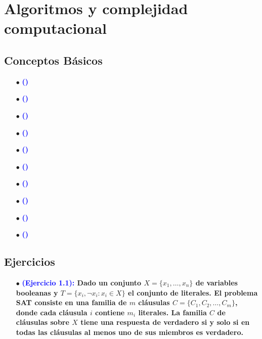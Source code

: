 \documentclass[12pt]{article}
\begin{document}
\section{Algoritmos y complejidad computacional}
{
    \subsection{Conceptos Básicos}
    {
        \begin{enumerate}
            \item[$\bullet$]\textbf{\textcolor{blue}{()}  }{}
            
            \item[$\bullet$]\textbf{\textcolor{blue}{()}  }{}
            
            \item[$\bullet$]\textbf{\textcolor{blue}{()}  }{}
            
            \item[$\bullet$]\textbf{\textcolor{blue}{()}  }{}
            
            \item[$\bullet$]\textbf{\textcolor{blue}{()}  }{}
            
            \item[$\bullet$]\textbf{\textcolor{blue}{()}  }{}
            
            \item[$\bullet$]\textbf{\textcolor{blue}{()}  }{}
            
            \item[$\bullet$]\textbf{\textcolor{blue}{()}  }{}
            
            \item[$\bullet$]\textbf{\textcolor{blue}{()}  }{}
            
            \item[$\bullet$]\textbf{\textcolor{blue}{()}  }{}
        \end{enumerate}
    }

    \subsection{Ejercicios}
    {

        \begin{enumerate}
            \item[$\bullet$]\textbf{\textcolor{blue}{(Ejercicio 1.1): } Dado un conjunto $X = \{x_1, \dots, x_n\}$ de variables booleanas y $T = \{x_i, \neg x_i : x_i \in X\}$ el conjunto de literales.  
            El problema SAT consiste en una familia de $m$ cláusulas $C = \{C_1, C_2, \dots, C_m\}$, donde cada cláusula $i$ contiene $m_i$ literales.  
            La familia $C$ de cláusulas sobre $X$ tiene una respuesta de verdadero si y solo si en todas las cláusulas al menos uno de sus miembros es verdadero.}
            

\end{enumerate}}}
\end{document}
